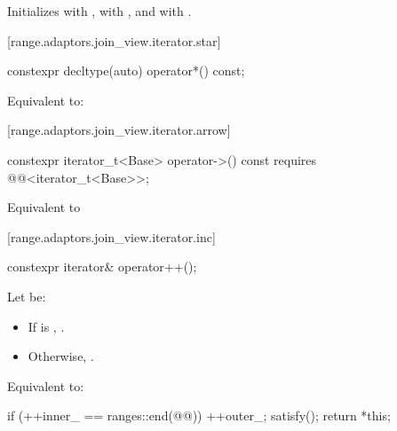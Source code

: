 \begin{addedblock}
\begin{itemdescr}
\pnum
\effects Initializes  with ,
 with , and
 with .
\end{itemdescr}

[range.adaptors.join_view.iterator.star]{}

\begin{itemdecl}
constexpr decltype(auto) operator*() const;
\end{itemdecl}

\begin{itemdescr}
\pnum
\effects Equivalent to: 
\end{itemdescr}

[range.adaptors.join_view.iterator.arrow]{}

\begin{itemdecl}
constexpr iterator_t<Base> operator->() const
  requires @@<iterator_t<Base>>;
\end{itemdecl}

\begin{itemdescr}
\pnum
\effects Equivalent to 
\end{itemdescr}

[range.adaptors.join_view.iterator.inc]{}

\begin{itemdecl}
constexpr iterator& operator++();
\end{itemdecl}

\begin{itemdescr}
\pnum
Let  be:
\begin{itemize}
\item If  is , .
\item Otherwise, .
\end{itemize}

\pnum
\effects Equivalent to:
\begin{codeblock}
if (++inner_ == ranges::end(@@)) {
  ++outer_;
  satisfy();
}
return *this;
\end{codeblock}
\end{itemdescr}


\end{addedblock}

